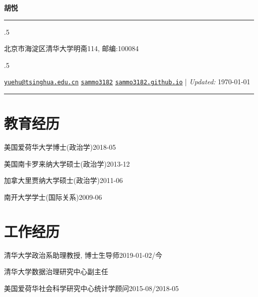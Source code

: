 \documentclass[10.5pt,]{article}
\providecommand{\tightlist}{%
	\setlength{\itemsep}{0pt}\setlength{\parskip}{0pt}}
\renewenvironment{itemize}{
	\begin{list}{}{
			\setlength{\leftmargin}{1.5em}
		}
	}{
	\end{list}
}
\begin{document}
	
	
	\centerline{\huge \bf 胡悦}
	
	
	
	\vspace{2 mm}
	
	\hrule
	
	\vspace{2 mm}
	
	
	\moveleft.5\hoffset\centerline{北京市海淀区清华大学明斋114,
邮编:100084}
	\moveleft.5\hoffset\centerline{ {\FA\faEnvelope} \hspace{1 mm} \href{mailto:}{\tt \href{mailto:yuehu@tsinghua.edu.cn}{\nolinkurl{yuehu@tsinghua.edu.cn}}} \hspace{1 mm}  {\FA\faGithub} \hspace{1 mm} \href{http://github.com/sammo3182}{\tt sammo3182} \hspace{1 mm}    {\FA\faGlobe} \hspace{1 mm} \href{http://sammo3182.github.io}{\tt sammo3182.github.io}    | \emph{Updated:} \today}
	
	\vspace{2 mm}
	
	\hrule
	
		
	\hypertarget{ux6559ux80b2ux7ecfux5386}{%
 \section{教育经历}\label{ux6559ux80b2ux7ecfux5386}}

 \begin{itemize}
 \tightlist
 \item
   美国爱荷华大学博士(政治学)\hfill 2018-05
 \item
   美国南卡罗来纳大学硕士(政治学)\hfill 2013-12
 \item
   加拿大里贾纳大学硕士(政治学)\hfill 2011-06
 \item
   南开大学学士(国际关系)\hfill 2009-06
 \end{itemize}

 \hypertarget{ux5de5ux4f5cux7ecfux5386}{%
 \section{工作经历}\label{ux5de5ux4f5cux7ecfux5386}}

 \begin{itemize}
 \tightlist
 \item
   清华大学政治系助理教授, 博士生导师\hfill 2019-01-02/今

   \begin{itemize}
   \tightlist
   \item
     清华大学数据治理研究中心副主任
   \end{itemize}
 \item
   美国爱荷华社会科学研究中心统计学顾问\hfill 2015-08/2018-05
 \end{itemize}
\end{document}
